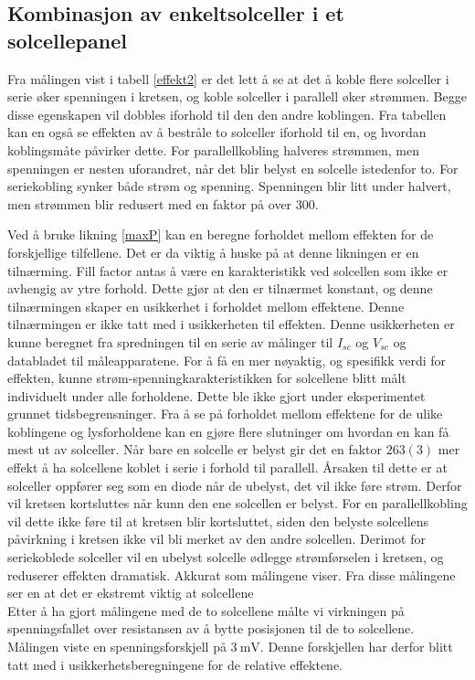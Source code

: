 \documentclass[%
 reprint,
 amsmath,amssymb,
 aps,
 norsk,
 booktabs
]{revtex4-1}
\begin{document}
\subsection{Kombinasjon av enkeltsolceller i et solcellepanel}
Fra målingen vist i tabell \vref{effekt2} er det lett å se at det å koble flere solceller i serie øker spenningen i kretsen, og koble solceller i parallell øker strømmen. Begge disse egenskapen vil dobbles iforhold til den den andre koblingen. Fra tabellen kan en også se effekten av å bestråle to solceller iforhold til en, og hvordan koblingsmåte påvirker dette. For parallellkobling halveres strømmen, men spenningen er nesten uforandret, når det blir belyst en solcelle istedenfor to. For seriekobling synker både strøm og spenning. Spenningen blir litt under halvert, men strømmen blir redusert med en faktor på over $300$. \par
Ved å bruke likning \eqref{maxP} kan en beregne forholdet mellom effekten for de forskjellige tilfellene. Det er da viktig å huske på at denne likningen er en tilnærming. Fill factor antas å være en karakteristikk ved solcellen som ikke er avhengig av ytre forhold. Dette gjør at den er tilnærmet konstant, og denne tilnærmingen skaper en usikkerhet i forholdet mellom effektene. Denne tilnærmingen er ikke tatt med i usikkerheten til effekten. Denne usikkerheten er kunne beregnet fra spredningen til en serie av målinger til $I_{sc}$ og $V_{sc}$ og databladet til måleapparatene. For å få en mer nøyaktig, og spesifikk verdi for effekten, kunne strøm-spenningkarakteristikken for solcellene blitt målt individuelt under alle forholdene. Dette ble ikke gjort under eksperimentet grunnet tidsbegrensninger. Fra å se på forholdet mellom effektene for de ulike koblingene og lysforholdene kan en gjøre flere slutninger om hvordan en kan få mest ut av solceller. Når bare en solcelle er belyst gir det en faktor $263(3)$ mer effekt å ha solcellene koblet i serie i forhold til parallell. Årsaken til dette er at solceller oppfører seg som en diode når de ubelyst, det vil ikke føre strøm. Derfor vil kretsen kortsluttes når kunn den ene solcellen er belyst. For en parallellkobling vil dette ikke føre til at kretsen blir kortsluttet, siden den belyste solcellens påvirkning i kretsen ikke vil bli merket av den andre solcellen. Derimot for seriekoblede solceller vil en ubelyst solcelle ødlegge strømførselen i kretsen, og reduserer effekten dramatisk. Akkurat som målingene viser. Fra disse målingene ser en at det er ekstremt viktig at solcellene\\
Etter å ha gjort målingene med de to solcellene målte vi virkningen på spenningsfallet over resistansen av å bytte posisjonen til de to solcellene. Målingen viste en spenningsforskjell på $\SI{3}{\milli\volt}$. Denne forskjellen har derfor blitt tatt med i usikkerhetsberegningene for de relative effektene.
\end{document}
